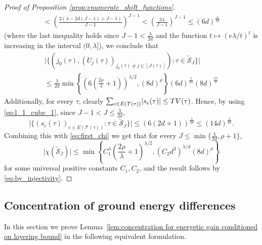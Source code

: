 \documentclass[11pt, reqno]{amsart}
\numberwithin{equation}{section}
\begin{document}
\begin{proof}[Proof of Proposition \ref{prop:enumerate_shift_functions}]
\begin{multline*}
<\left(\frac{3(\lambda-2d(J-1)+J-1)}{J-1}\right)^{J-1}<\left(\frac{3\lambda}{J-1}\right)^{J-1}\leq (6d)^{\frac{\lambda}{2d}}
\end{multline*}
(where the last inequality holds since $J-1<\frac{\lambda}{2d}$ and the function $t\mapsto (e\lambda/t)^t$ is increasing in the interval $(0,\lambda]$), we conclude that
\begin{multline}\label{eq:first_chi}
\lvert\{(j_0(\tau),
(U_j(\tau))_{j_0(\tau)\neq j\in[J(\tau)]})\colon \tau\in\tilde{\mathcal S}_J\}\rvert\\
\leq \frac{\lambda}{2d}\min\left\{\left(6\left(\frac{2\rho}{\lambda}+1\right)\right)^{\lambda/2},\left(8d\right)^{\rho}\right\}(6d)^{\frac{\lambda}{2d}}(8d)^{\frac{2\lambda}{d}}
\end{multline}
Additionally, for every $\tau$, clearly $\sum_{e\in E({\mathcal T}(\tau))}\lvert s_e(\tau)\rvert\leq{\rm TV}(\tau)$. Hence, by using \eqref{eq:l_1_cube_1}, since $J-1<J\leq\frac{\lambda}{2d}$,
$$
\lvert\{(s_e(\tau))_{e\in E({\mathcal T}(\tau))}\colon \tau\in\tilde{\mathcal S}_J\}\rvert\leq \left(6(2d+1)\right)^{\frac{\lambda}{2d}}\leq\left(14d\right)^{\frac{\lambda}{2d}}.
$$
Combining this with \eqref{eq:first_chi} we get that for every $J\leq\min\{\frac{\lambda}{2d},\rho+1\}$,
\begin{equation*}
\lvert\chi(\tilde{\mathcal S}_J)\rvert\leq \min\left\{C_1^{\lambda}\left(\frac{2\rho}{\lambda}+1\right)^{\lambda/2}, \left(C_2 d^3\right)^{\lambda/d}\left(8d\right)^{\rho}\right\}
\end{equation*}
for some universal positive constants $C_1,C_2$, and the result follows by \eqref{eq:by_injectivity}.
\end{proof}

\subsection{Concentration of ground energy differences} 
\label{subsec:concentration}

In this section we prove Lemma~\ref{lem:concentration for energetic gain conditioned on layering bound} in the following equivalent formulation.
\end{document}
